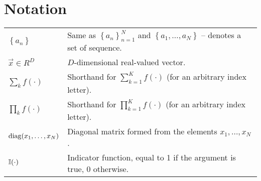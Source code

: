 \chapter{Notation}
\begin{table}[h]
\begin{tabulary}{1\textwidth}{LL}
    $\left\{a_n\right\}$                & Same as $\left\{a_n\right\}_{n = 1}^N$ and $\left\{a_1, \dotsc, a_N\right\}$ -- denotes a set of sequence. \\
    $\vec x \in R^D$                    & $D$-dimensional real-valued vector. \\
    $\sum_k f(\cdot)$                   & Shorthand for $\sum_{k = 1}^K f(\cdot)$ (for an arbitrary index letter). \\
    $\prod_k f(\cdot)$                  & Shorthand for $\prod_{k = 1}^K f(\cdot)$ (for an arbitrary index letter). \\
    $\operatorname{diag}(x_1, \dotsc, x_N)$           & Diagonal matrix formed from the elements $x_1, \dotsc, x_N$. \\
    $\operatorname{\mathbb I}(\cdot)$							& Indicator function, equal to 1 if the argument is true, 0 otherwise.
\end{tabulary}
\end{table}